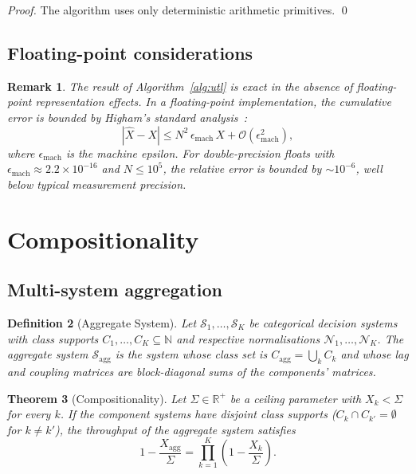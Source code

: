 \documentclass[twocolumn,11pt,a4paper]{article}
\newtheorem{theorem}{Theorem}[section]
\newtheorem{definition}[theorem]{Definition}
\newtheorem{remark}[theorem]{Remark}
\newcommand{\Real}{\mathbb{R}}
\newcommand{\Natural}{\mathbb{N}}
\newcommand{\TP}{X}
\newcommand{\Norm}{\mathcal{N}}
\newcommand{\Sys}{\mathcal{S}}
\newcommand{\classcount}{N}
\begin{document}
\begin{proof}
The algorithm uses only deterministic arithmetic primitives. \qed
\end{proof}

\subsection{Floating-point considerations}

\begin{remark}
The result of Algorithm~\ref{alg:utl} is exact in the absence of floating-point representation effects. In a floating-point implementation, the cumulative error is bounded by Higham's standard analysis~\citep{higham2002accuracy}:
\[
|\hat\TP - \TP| \leq \classcount^2 \, \epsilon_{\mathrm{mach}} \, \TP + \mathcal{O}(\epsilon_{\mathrm{mach}}^2),
\]
where $\epsilon_{\mathrm{mach}}$ is the machine epsilon. For double-precision floats with $\epsilon_{\mathrm{mach}} \approx 2.2 \times 10^{-16}$ and $\classcount \leq 10^5$, the relative error is bounded by $\sim 10^{-6}$, well below typical measurement precision.
\end{remark}

\section{Compositionality}
\label{sec:composition}

\subsection{Multi-system aggregation}

\begin{definition}[Aggregate System]
\label{def:aggregate}
Let $\Sys_1, \ldots, \Sys_K$ be categorical decision systems with class supports $C_1, \ldots, C_K \subseteq \Natural$ and respective normalisations $\Norm_1, \ldots, \Norm_K$. The \emph{aggregate system} $\Sys_{\mathrm{agg}}$ is the system whose class set is $C_{\mathrm{agg}} = \bigcup_k C_k$ and whose lag and coupling matrices are block-diagonal sums of the components' matrices.
\end{definition}

\begin{theorem}[Compositionality]
\label{thm:compositionality}
Let $\Sigma \in \Real^+$ be a ceiling parameter with $\TP_k < \Sigma$ for every $k$. If the component systems have disjoint class supports ($C_k \cap C_{k'} = \emptyset$ for $k \neq k'$), the throughput of the aggregate system satisfies
\begin{equation}
1 - \frac{\TP_{\mathrm{agg}}}{\Sigma} = \prod_{k=1}^K \left(1 - \frac{\TP_k}{\Sigma}\right).
\label{eq:composition}
\end{equation}
\end{theorem}
\end{document}
